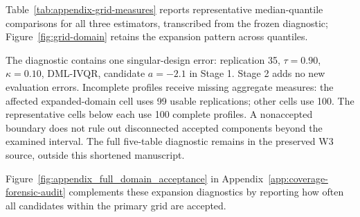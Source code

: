 Table~\ref{tab:appendix-grid-measures} reports representative median-quantile comparisons for all three estimators, transcribed from the frozen diagnostic; Figure~\ref{fig:grid-domain} retains the expansion pattern across quantiles.

The diagnostic contains one singular-design error: replication 35, $\tau=0.90$, $\kappa=0.10$, DML-IVQR, candidate $a=-2.1$ in Stage 1. Stage 2 adds no new evaluation errors. Incomplete profiles receive missing aggregate measures: the affected expanded-domain cell uses 99 usable replications; other cells use 100. The representative cells below each use 100 complete profiles. A nonaccepted boundary does not rule out disconnected accepted components beyond the examined interval. The full five-table diagnostic remains in the preserved W3 source, outside this shortened manuscript.


\FloatBarrier

Figure~\ref{fig:appendix_full_domain_acceptance} in Appendix~\ref{app:coverage-forensic-audit} complements these expansion diagnostics by reporting how often all candidates within the primary grid are accepted.
\Needspace{7\baselinedist}
